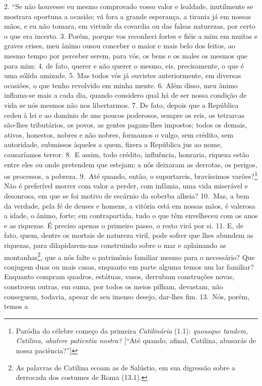 2. “Se não houvesse eu mesmo comprovado vosso valor e lealdade, inutilmente se
mostrara oportuna a ocasião; vã fora a grande esperança, a tirania já em nossas
mãos, e eu não tomara, em virtude da covardia ou das falsas naturezas, por
certo o que era incerto. 3. Porém, porque vos reconheci fortes e fiéis a mim em
muitas e graves crises, meu ânimo ousou conceber o maior e mais belo dos
feitos, ao mesmo tempo por perceber serem, para vós, os bens e os males os
mesmos que para mim: 4. de fato, querer e não querer o mesmo, eis,
precisamente, o que é uma sólida amizade. 5. Mas todos vós já ouvistes
anteriormente, em diversas ocasiões, o que tenho revolvido em minha mente. 6.
Além disso, meu ânimo inflama-se mais a cada dia, quando considero qual há de
ser nossa condição de vida se nós mesmos não nos libertarmos. 7. De fato,
depois que a República cedeu à lei e ao domínio de uns poucos poderosos, sempre
os reis, os tetrarcas são-lhes tributários, os povos, as gentes pagam-lhes
impostos; todos os demais, ativos, honestos, nobres e não nobres, formamos o
vulgo, sem crédito, sem autoridade, submissos àqueles a quem, fizera a
República jus ao nome, causaríamos terror. 8.~E assim, todo crédito,
influência, honraria, riqueza estão entre eles ou onde pretendem que estejam; a
nós deixaram as derrotas, os perigos, os processos, a pobreza. 9.~Até quando,
então, o suportareis, bravíssimos varões?\footnote{Paródia do célebre começo da
primeira \emph{Catilinária} (1.1): \emph{quousque tandem, Catilina, abutere
patientia nostra?} [``Até quando, afinal, Catilina, abusarás de nossa
paciência?'']} Não é preferível morrer com valor a perder, com infâmia, uma
vida miserável e desonrosa, em que se foi motivo de escárnio da soberba alheia?
10.~Mas, a bem da verdade, pela fé de deuses e homens, a vitória está em nossas
mãos, é valerosa a idade, o ânimo, forte; em contrapartida, tudo o que têm
envelheceu com os anos e as riquezas. É preciso apenas o primeiro passo, o
resto virá por si. 11. E, de fato, quem, dentre os mortais de natureza viril,
pode sofrer que lhes abundem as riquezas, para dilapidarem-nas construindo
sobre o mar e aplainando as montanhas\footnote{As palavras de Catilina ecoam as
de Salústio, em sua digressão sobre a derrocada dos costumes de Roma (13.1).}, que a nós falte o patrimônio familiar mesmo para o necessário? Que
conjugem duas ou mais casas, enquanto em parte alguma temos um lar familiar?
Enquanto compram quadros, estátuas, vasos, derrubam construções novas,
constroem outras, em suma, por todos os meios pilham, devastam, não conseguem,
todavia, apesar de seu imenso desejo, dar-lhes fim. 13.~Nós, porém, temos a
